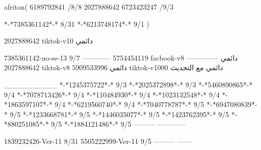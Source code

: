 afriton(
6189792841 /8/8
2027888642
6723423247 /9/3

*-*7385361142*-* 8/31
*-*6213748174*-* 9/1
)

2027888642 tiktok-v10
دائمي


7385361142-no-se-13
9/7
------------
5754454119 facbook-v8
دائمي
--------------
2027888642 tiktok-v8
دائمي
5909533996 tiktok-v1000
دائمي مع التحديث

__________
*-*1245375722*-* 9/3
*-*2025372898*-* 9/3
*-*5460890865*-* 9/4
*-*7078713426*-* 9/4
*-*110484930*-* 9/4
*-*1023132548*-* 9/4
*-*1863597107*-* 9/4
*-*6219560740*-* 9/4
*-*7040778787*-* 9/5
*-*6947080839*-* 9/5
*-*1233668781*-* 9/5
*-*1446035077*-* 9/5
*-*1423762395*-* 9/5
*-*880251085*-* 9/5
*-*1884121486*-* 9/5
---------
------------

1839232426-Ver-11
8/31
5505222999-Ver-11
9/5
---------
------

